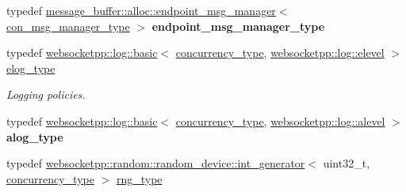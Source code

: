 \begin{DoxyCompactItemize}
\item 
typedef \hyperlink{classwebsocketpp_1_1message__buffer_1_1alloc_1_1endpoint__msg__manager}{message\+\_\+buffer\+::alloc\+::endpoint\+\_\+msg\+\_\+manager}$<$ \hyperlink{classwebsocketpp_1_1message__buffer_1_1alloc_1_1con__msg__manager}{con\+\_\+msg\+\_\+manager\+\_\+type} $>$ {\bfseries endpoint\+\_\+msg\+\_\+manager\+\_\+type}\hypertarget{structwebsocketpp_1_1config_1_1core__client_a1ccd94e4f4d1102cdb81b98284ed1166}{}\label{structwebsocketpp_1_1config_1_1core__client_a1ccd94e4f4d1102cdb81b98284ed1166}

\item 
typedef \hyperlink{classwebsocketpp_1_1log_1_1basic}{websocketpp\+::log\+::basic}$<$ \hyperlink{classwebsocketpp_1_1concurrency_1_1basic}{concurrency\+\_\+type}, \hyperlink{structwebsocketpp_1_1log_1_1elevel}{websocketpp\+::log\+::elevel} $>$ \hyperlink{structwebsocketpp_1_1config_1_1core__client_a24f1bae9e8a92bf7950153ed39eaffb8}{elog\+\_\+type}\hypertarget{structwebsocketpp_1_1config_1_1core__client_a24f1bae9e8a92bf7950153ed39eaffb8}{}\label{structwebsocketpp_1_1config_1_1core__client_a24f1bae9e8a92bf7950153ed39eaffb8}

\begin{DoxyCompactList}\small\item\em Logging policies. \end{DoxyCompactList}\item 
typedef \hyperlink{classwebsocketpp_1_1log_1_1basic}{websocketpp\+::log\+::basic}$<$ \hyperlink{classwebsocketpp_1_1concurrency_1_1basic}{concurrency\+\_\+type}, \hyperlink{structwebsocketpp_1_1log_1_1alevel}{websocketpp\+::log\+::alevel} $>$ {\bfseries alog\+\_\+type}\hypertarget{structwebsocketpp_1_1config_1_1core__client_a98c19fba0898e3842c001248df82fb2a}{}\label{structwebsocketpp_1_1config_1_1core__client_a98c19fba0898e3842c001248df82fb2a}

\item 
typedef \hyperlink{classwebsocketpp_1_1random_1_1random__device_1_1int__generator}{websocketpp\+::random\+::random\+\_\+device\+::int\+\_\+generator}$<$ uint32\+\_\+t, \hyperlink{classwebsocketpp_1_1concurrency_1_1basic}{concurrency\+\_\+type} $>$ \hyperlink{structwebsocketpp_1_1config_1_1core__client_adacb3a0ec249a2dea11871f299cf660f}{rng\+\_\+type}\hypertarget{structwebsocketpp_1_1config_1_1core__client_adacb3a0ec249a2dea11871f299cf660f}{}\label{structwebsocketpp_1_1config_1_1core__client_adacb3a0ec249a2dea11871f299cf660f}


\end{DoxyCompactItemize}
